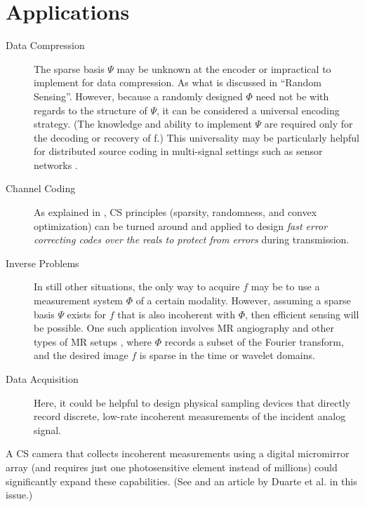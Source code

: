 \section{Applications}
\begin{description}
	\item[Data Compression] The sparse basis $\Psi$ may be unknown at the encoder or impractical to implement for data compression. As what is discussed in ``Random Sensing''. However, because a randomly designed $\Phi$ need not be with regards to the structure of $\Psi$, it can be considered a universal encoding strategy. (The knowledge and ability to implement $\Psi$ are required only for the decoding or recovery of f.) This universality may be particularly helpful for distributed source coding in multi-signal settings such as sensor networks \cite{27}.
	\item[Channel Coding] As explained in \cite{15}, CS principles (sparsity, randomness, and convex optimization) can be turned around and applied to design \emph{\textcolor[rgb]{1,0,0}{fast error correcting codes over the reals to protect from errors}} during transmission.
	\item[Inverse Problems]  In still other situations, the only way to acquire $f$ may be to use a measurement system $\Phi$ of a certain modality. However, assuming a sparse basis $\Psi$ exists for $f$ that is also incoherent with $\Phi$, then efficient sensing will be possible. One such application involves MR angiography \cite{Candes2006} and other types of MR setups \cite{28}, where $\Phi$ records a subset of the Fourier transform, and the desired image $f$ is sparse in the time or wavelet domains. 
	\item[Data Acquisition] Here, it could be helpful to design physical sampling devices that directly record discrete, low-rate incoherent measurements of the incident analog signal.
\end{description}

A CS camera that collects incoherent measurements using a digital micromirror array (and requires just one photosensitive element instead of millions) could significantly expand these capabilities. (See \cite{29} and an article by Duarte et al. in this issue.)


